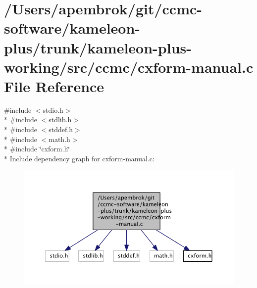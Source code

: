 \hypertarget{cxform-manual_8c}{\section{/\-Users/apembrok/git/ccmc-\/software/kameleon-\/plus/trunk/kameleon-\/plus-\/working/src/ccmc/cxform-\/manual.c File Reference}
\label{cxform-manual_8c}
}
{\ttfamily \#include $<$stdio.\-h$>$}\\*
{\ttfamily \#include $<$stdlib.\-h$>$}\\*
{\ttfamily \#include $<$stddef.\-h$>$}\\*
{\ttfamily \#include $<$math.\-h$>$}\\*
{\ttfamily \#include \char`\"{}cxform.\-h\char`\"{}}\\*
Include dependency graph for cxform-\/manual.c\-:\nopagebreak
\begin{figure}[H]
\begin{center}
\leavevmode
\includegraphics[width=350pt]{cxform-manual_8c__incl}
\end{center}
\end{figure}
